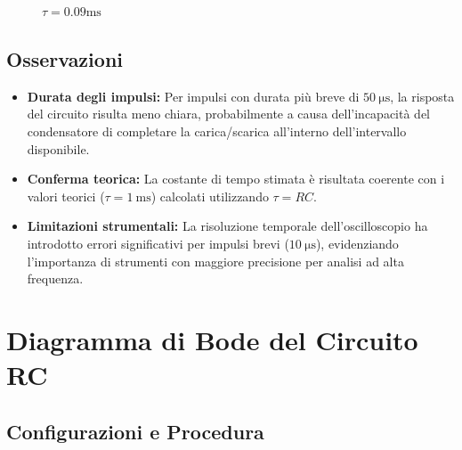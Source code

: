 \documentclass[a4paper,10pt]{article}
\begin{document}
\begin{figure}[htbp]
\begin{minipage}{0.32\textwidth}
        \caption{\(\tau = 0.09 \si{\milli\second}\)}
    \end{minipage}
\end{figure}

\subsection{Osservazioni}
\begin{itemize}
    \item \textbf{Durata degli impulsi:} Per impulsi con durata più breve di \(\SI{50}{\micro\second}\), la risposta del circuito risulta meno chiara, probabilmente a causa dell’incapacità del condensatore di completare la carica/scarica all'interno dell'intervallo disponibile.
    \item \textbf{Conferma teorica:} La costante di tempo stimata è risultata coerente con i valori teorici (\(\tau = \SI{1}{\milli\second}\)) calcolati utilizzando \(\tau = RC\).
    \item \textbf{Limitazioni strumentali:} La risoluzione temporale dell’oscilloscopio ha introdotto errori significativi per impulsi brevi (\(\SI{10}{\micro\second}\)), evidenziando l’importanza di strumenti con maggiore precisione per analisi ad alta frequenza.
\end{itemize}



\section{Diagramma di Bode del Circuito RC} \label{sec:diagramma_bode}

\subsection{Configurazioni e Procedura}
\end{document}
